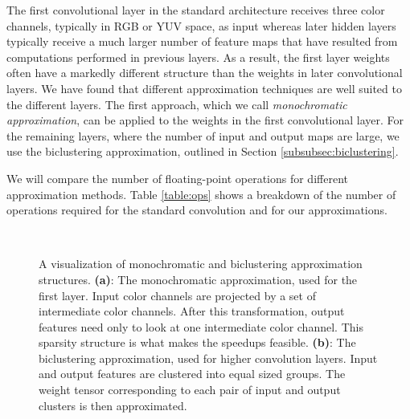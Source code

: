 The first convolutional layer in the standard architecture receives
three color channels, typically in RGB or YUV space, as input whereas
later hidden layers typically receive a much larger number of feature
maps that have resulted from computations performed in previous
layers. As a result, the first layer weights often have a markedly
different structure than the weights in later convolutional layers. We
have found that different approximation techniques are well suited to
the different layers. The first approach, which we call {\em monochromatic
approximation}, can be applied to the weights in the first
convolutional layer. For the remaining layers, where the number of
input and output maps are large, we use the 
biclustering approximation, outlined in Section
\ref{subsubsec:biclustering}.

We will compare the number of floating-point operations for different
approximation methods. Table \ref{table:ops} shows a breakdown of the number of operations required for the standard convolution and for our approximations.

\begin{figure}[ht]
\centering
\mbox{
\hspace{5mm}
\hspace{5mm}
}
\vspace{-3mm}
\caption{ A visualization of monochromatic and biclustering approximation structures. {\bf (a)}: The monochromatic approximation, used for the first layer. Input color channels are projected by a set of intermediate color channels. After this transformation, output features need only to look at one intermediate color channel. This sparsity structure is what makes the speedups feasible. {\bf (b)}: The biclustering approximation, used for higher convolution layers. Input and output features are clustered into equal sized groups. The weight tensor corresponding to each pair of input and output clusters is then approximated.}
\end{figure}

